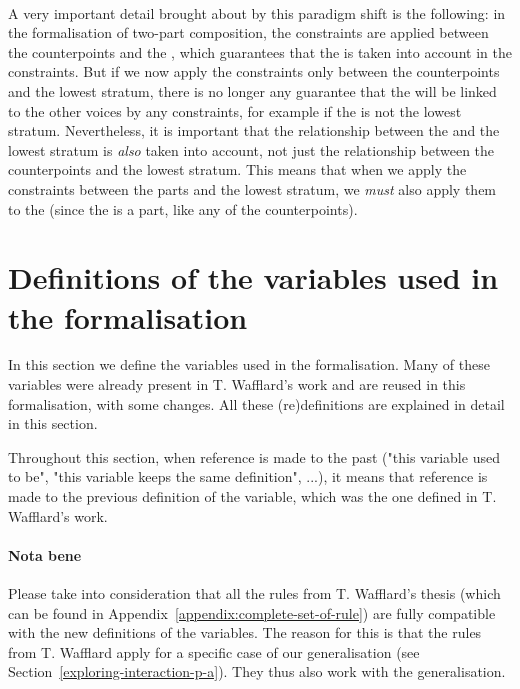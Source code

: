 \paragraph{}
A very important detail brought about by this paradigm shift is the following: in the formalisation of two-part composition, the constraints are applied between the counterpoints and the \cf, which guarantees that the \cfs is taken into account in the constraints. But if we now apply the constraints only between the counterpoints and the lowest stratum, there is no longer any guarantee that the \cfs will be linked to the other voices by any constraints, for example if the \cfs is not the lowest stratum. Nevertheless, it is important that the relationship between the \cfs and the lowest stratum is \textit{also} taken into account, not just the relationship between the counterpoints and the lowest stratum. This means that when we apply the constraints between the parts and the lowest stratum, we \textit{must} also apply them to the \cfs (since the \cfs is a part, like any of the counterpoints).


\section{Definitions of the variables used in the formalisation} \label{section:changes induced}
In this section we define the variables used in the formalisation. Many of these variables were already present in T. Wafflard's work and are reused in this formalisation, with some changes. All these (re)definitions are explained in detail in this section.

Throughout this section, when reference is made to the past ("this variable used to be", "this variable keeps the same definition", ...), it means that reference is made to the previous definition of the variable, which was the one defined in T. Wafflard's work.

\paragraph{Nota bene}
Please take into consideration that all the rules from T. Wafflard's thesis (which can be found in Appendix~\ref{appendix:complete-set-of-rule}) are fully compatible with the new definitions of the variables. The reason for this is that the rules from T. Wafflard apply for a specific case of our generalisation (see Section~\ref{exploring-interaction-p-a}). They thus also work with the generalisation.  

